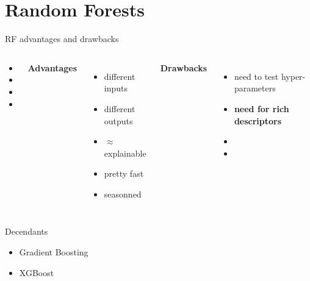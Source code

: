 \documentclass{irdbeamer}
\begin{document}
\begin{frame}{}
\end{frame}

\section{Random Forests}

\begin{frame}{}
\end{frame}



\begin{frame}{RF advantages and drawbacks}
\begin{columns}
\begin{column}{0.05\textwidth}
\begin{itemize}
    \item[] 
    \item[] 
    \item[] 
    \item[] 
\end{itemize}
\end{column}
        \textbf{Advantages}
        \begin{itemize}
            \item<1-> different inputs
            \item<2-> different outputs
            \item<3-> $\approx$ explainable
            \item<4-> pretty fast
            \item<5-> seasonned
        \end{itemize}
        \textbf{Drawbacks}
        \begin{itemize}
            \item<6-> need to test hyper-parameters
            \item<7-> \textbf{need for rich descriptors}
            \item[] 
            \item[] 
        \end{itemize}
\end{columns}
\end{frame}

\begin{frame}{Decendants}
    \begin{itemize}
        \item Gradient Boosting
        \item XGBoost
    \end{itemize}
\end{frame}
\end{document}

